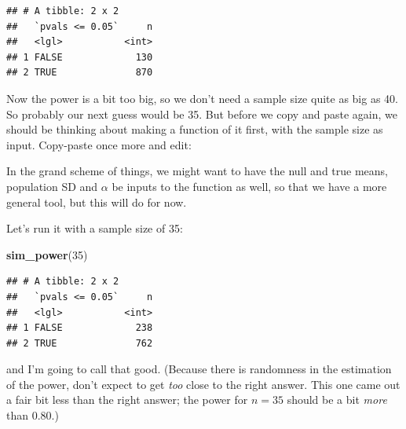 \documentclass[]{tufte-book}
\newenvironment{Shaded}{}{}
\newcommand{\ControlFlowTok}[1]{\textcolor[rgb]{0.00,0.44,0.13}{\textbf{#1}}}
\newcommand{\DataTypeTok}[1]{\textcolor[rgb]{0.56,0.13,0.00}{#1}}
\newcommand{\DecValTok}[1]{\textcolor[rgb]{0.25,0.63,0.44}{#1}}
\newcommand{\FloatTok}[1]{\textcolor[rgb]{0.25,0.63,0.44}{#1}}
\newcommand{\KeywordTok}[1]{\textcolor[rgb]{0.00,0.44,0.13}{\textbf{#1}}}
\newcommand{\NormalTok}[1]{#1}
\newcommand{\OperatorTok}[1]{\textcolor[rgb]{0.40,0.40,0.40}{#1}}
\newcommand{\StringTok}[1]{\textcolor[rgb]{0.25,0.44,0.63}{#1}}
\theoremstyle{definition}
\theoremstyle{definition}
\theoremstyle{definition}
\theoremstyle{remark}
\begin{document}
\begin{verbatim}
## # A tibble: 2 x 2
##   `pvals <= 0.05`     n
##   <lgl>           <int>
## 1 FALSE             130
## 2 TRUE              870
\end{verbatim}

Now the power is a bit too big, so we don't need a sample size quite as
big as 40. So probably our next guess would be 35. But before we copy
and paste again, we should be thinking about making a function of it
first, with the sample size as input. Copy-paste once more and edit:

\begin{Shaded}
\end{Shaded}

In the grand scheme of things, we might want to have the null and true
means, population SD and \(\alpha\) be inputs to the function as well,
so that we have a more general tool, but this will do for now.

Let's run it with a sample size of 35:

\begin{Shaded}
\begin{Highlighting}[]
\KeywordTok{sim_power}\NormalTok{(}\DecValTok{35}\NormalTok{)}
\end{Highlighting}
\end{Shaded}

\begin{verbatim}
## # A tibble: 2 x 2
##   `pvals <= 0.05`     n
##   <lgl>           <int>
## 1 FALSE             238
## 2 TRUE              762
\end{verbatim}

and I'm going to call that good. (Because there is randomness in the
estimation of the power, don't expect to get \emph{too} close to the
right answer. This one came out a fair bit less than the right answer;
the power for \(n=35\) should be a bit \emph{more} than 0.80.)
\end{document}
